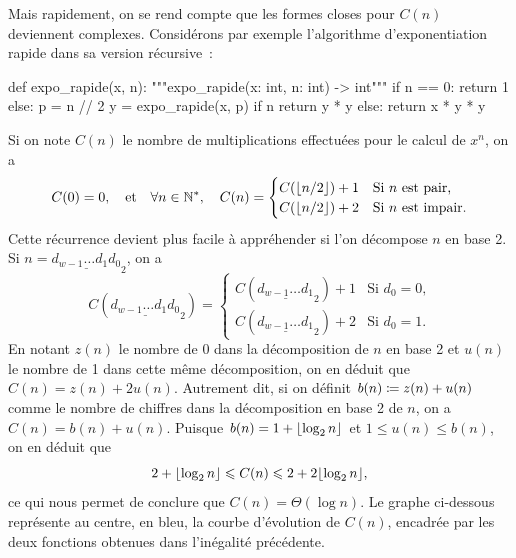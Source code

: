 \documentclass{magnolia}
\begin{document}
Mais rapidement, on se rend compte que les formes closes pour $C(n)$ deviennent complexes.
Considérons par exemple l'algorithme d'exponentiation rapide dans sa version récursive~:
\begin{pythoncodeline}
def expo_rapide(x, n):
    """expo_rapide(x: int, n: int) -> int"""
    if n == 0:
        return 1
    else:
        p = n // 2
        y = expo_rapide(x, p)
        if n %
            return y * y
        else:
            return x * y * y
\end{pythoncodeline}
Si on note $C(n)$ le nombre de multiplications effectuées pour le calcul de $x^n$, on a
\[C(0)=0,\quad\text{et}\quad \forall n\in{\mathbb{N}^*},\quad C(n)=
  \begin{cases}
  C(\left\lfloor n/2\right\rfloor) + 1 & \text{Si $n$ est pair,}\\
  C(\left\lfloor n/2\right\rfloor) + 2 & \text{Si $n$ est impair.}
  \end{cases}\]
Cette récurrence devient plus facile à appréhender si l'on décompose $n$ en
base 2. Si $n=\underline{d_{w-1}\ldots d_1 d_0}_2$, on a
\[C(\underline{d_{w-1}\ldots d_1 d_0}_2)=
  \begin{cases}
  C(\underline{d_{w-1}\ldots d_1}_2) + 1 & \text{Si $d_0=0$,}\\
  C(\underline{d_{w-1}\ldots d_1}_2) + 2 & \text{Si $d_0=1$.}
  \end{cases}\]
En notant $z(n)$ le nombre de 0 dans la décomposition de $n$ en base 2 et $u(n)$ le nombre
de 1 dans cette même décomposition, on en déduit que $C(n)=z(n)+2u(n)$. Autrement dit,
si on définit $b(n)\coloneqq z(n)+u(n)$ comme le nombre de chiffres dans la
décomposition en base 2 de $n$, on a $C(n)=b(n)+u(n)$. Puisque
$b(n)=1+\left\lfloor\log_2 n\right\rfloor$ et $1\leq u(n)\leq b(n)$, on en déduit que
\[2+\ent{\log_2 n}\leq C(n) \leq 2+2\ent{\log_2 n},\]
ce qui nous permet de conclure que $C(n)=\Theta(\log n)$.
Le graphe ci-dessous représente au centre, en bleu, la courbe d'évolution de $C(n)$,
encadrée par les deux fonctions obtenues dans l'inégalité précédente.
\begin{center}
\end{center}
\end{document}

